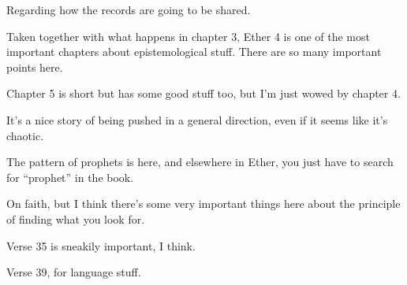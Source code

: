 \begin{compactdesc}
\begin{compactitem}
				\end{compactitem}
			\item[{\hyperref[ETHER-4-1]{Ether 4:1--3}}] \phantom{.}
				\begin{compactitem}
					\item Regarding how the records are going to be shared.
				\end{compactitem}
			\item[{\hyperref[ETHER-4]{Ether 4--5}}] \phantom{.}
				\begin{compactitem}
					\item Taken together with what happens in chapter 3, Ether 4 is one of the most important chapters about epistemological stuff. There are so many important points here.
					\item Chapter 5 is short but has some good stuff too, but I'm just wowed by chapter 4.
				\end{compactitem}
			\item[{\hyperref[ETHER-6-1]{Ether 6:1--12}}] \phantom{.}
				\begin{compactitem}
					\item It's a nice story of being pushed in a general direction, even if it seems like it's chaotic.
				\end{compactitem}
			\item[{\hyperref[ETHER-9-22]{Ether 9:22}}]
			\item[{\hyperref[ETHER-11-13]{Ether 11:13}}] \phantom{.}
				\begin{compactitem}
					\item The pattern of prophets is here, and elsewhere in Ether, you just have to search for ``prophet'' in the book.
				\end{compactitem}
			\item[{\hyperref[ETHER-12-3]{Ether 12:3--41}}] \phantom{.}
				\begin{compactitem}
					\item On faith, but I think there's some very important things here about the principle of finding what you look for.
					\item Verse 35 is sneakily important, I think.
					\item Verse 39, for language stuff.
				\end{compactitem}
			\item[{\hyperref[ETHER-15-19]{Ether 15:19}}]
			\item[{\hyperref[MORONI-2-2]{Moroni 2:2--3}}]
			\item[{\hyperref[MORONI-7-4]{Moroni 7:4--19}}] \phantom{.}

\end{compactdesc}
